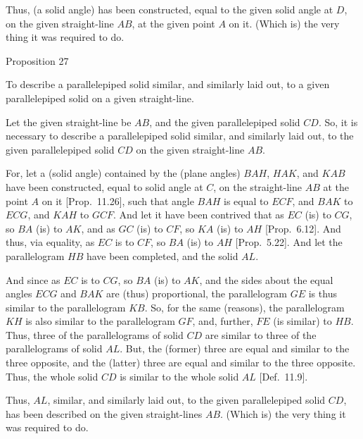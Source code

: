 Thus, (a solid angle) has been constructed, equal to the given solid angle at
$D$, on the given straight-line $AB$, at the given point $A$ on it.
(Which is) the very thing it was required to do.


\begin{center}
{\large Proposition 27}
\end{center}

To describe a parallelepiped solid similar,  and
similarly laid out, to a given parallelepiped solid on a given straight-line.

Let the given straight-line be $AB$, and the given parallelepiped solid
$CD$. So, it is necessary to describe a parallelepiped solid similar, and
similarly laid out, to the given parallelepiped solid $CD$ on the given straight-line $AB$.

For, let a (solid angle) contained by the (plane angles)
$BAH$, $HAK$, and $KAB$ have been constructed, equal to solid angle at
$C$, on the straight-line $AB$ at the point $A$ on it [Prop.~11.26], such that angle $BAH$ is equal to $ECF$, and $BAK$ to $ECG$,
and $KAH$ to $GCF$. And let it have been contrived that as $EC$
(is) to $CG$, so $BA$ (is) to $AK$, and as $GC$ (is) to $CF$, so
$KA$ (is) to $AH$ [Prop.~6.12]. And thus, via equality, as $EC$ is to $CF$, so
$BA$ (is) to $AH$ [Prop.~5.22]. And let the parallelogram $HB$ have been completed, and the solid $AL$.

\epsfysize=1.5in
\centerline{}

And since as $EC$ is to $CG$, so $BA$ (is) to $AK$, and the sides about the equal angles $ECG$ and $BAK$ are (thus) proportional, the parallelogram
$GE$ is thus similar to the parallelogram $KB$. So, for the same (reasons),
the parallelogram $KH$ is also similar to the parallelogram $GF$, and,
further, $FE$ (is similar) to $HB$. Thus, three of the parallelograms
of solid $CD$ are similar to three of the parallelograms of solid $AL$.
But, the (former) three are equal and similar to the three opposite, and
the (latter) three are equal and similar to the three opposite. Thus, the
whole solid $CD$ is similar to the whole solid $AL$ [Def.~11.9].

Thus, $AL$, similar, and similarly laid out, to the given parallelepiped solid
$CD$, has been described on the given straight-lines $AB$. (Which is) the very thing it was required to do.


